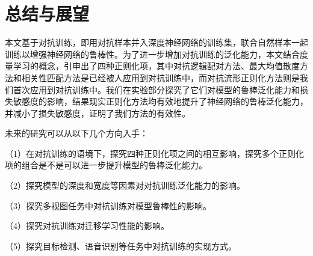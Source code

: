 \chapter{总结与展望}

本文基于对抗训练，即用对抗样本并入深度神经网络的训练集，联合自然样本一起训练以增强神经网络的鲁棒性。为了进一步增加对抗训练的泛化能力，本文结合度量学习的概念，引申出了四种正则化项，其中对抗逻辑配对方法、最大均值散度方法和相关性匹配方法是已经被人应用到对抗训练中，而对抗流形正则化方法则是我们首次应用到对抗训练中。我们在实验部分探究了它们对模型的鲁棒泛化能力和损失敏感度的影响，结果现实正则化方法均有效地提升了神经网络的鲁棒泛化能力，并减小了损失敏感度，证明了我们方法的有效性。

未来的研究可以从以下几个方向入手：

（1）在对抗训练的语境下，探究四种正则化项之间的相互影响，探究多个正则化项的组合是不是可以进一步提升模型的鲁棒泛化能力。

（2）探究模型的深度和宽度等因素对对抗训练泛化能力的影响。

（3）探究多视图任务中对抗训练对模型鲁棒性的影响。

（4）探究对抗训练对迁移学习性能的影响。

（5）探究目标检测、语音识别等任务中对抗训练的实现方式。